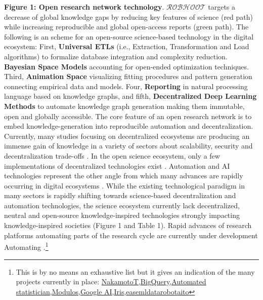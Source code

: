 \documentclass[10pt, a4paper, twocolumn]{article} %
\begin{document}
{{\small {\bf Figure 1: Open research network technology}. {\bf
    $\mathcal{ROBHOOT}$} targets a decrease of global knowledge gaps
  by reducing key features of science (red path) while increasing
  reproducible and global open-access reports (green path). The
  following is an scheme for an open-source science-based technology
  in the digital ecosystem: First, {\bf Universal ETLs} (i.e.,
  Extraction, Transformation and Load algorithms) to formalize
  database integration and complexity reduction. {\bf Bayesian Space
    Models} accounting for open-ended optimization techniques. Third,
  {\bf Animation Space} visualizing fitting procedures and pattern
  generation connecting empirical data and models. Four, {\bf
    Reporting} in natural processing language based on knowledge
  graphs, and fifth, {\bf Decentralized Deep Learning Methods} to
  automate knowledge graph generation making them immutable, open and
  globally accessible.}
The core feature of an open research network is to embed
knowledge-generation into reproducible automation and
decentralization. Currently, many studies focusing on decentralized
ecosystems are producing an immense gain of knowledge in a variety of
sectors about scalability, security and decentralization trade-offs
\citep{Golem2016,Durov2017,Androulaki2018,OceanProtocolFoundation2018,BigchainDBGmbH2018}. In
the open science ecosystem, only a few implementations of
decentralized technologies exist \citep{Gunther2018}. Automation and
AI technologies represent the other angle from which many advances are
rapidly occurring in digital ecosystems
\citep{Schmidhuber:2015,Reichstein,Gil2019}. While the existing
technological paradigm in many sectors is rapidly shifting towards
science-based decentralization and automation technologies, the
science ecosystem currently lack decentralized, neutral and
open-source knowledge-inspired technologies strongly impacting
knowledge-inspired societies (Figure 1 and Table 1). Rapid advances of
research platforms automating parts of the research cycle are
currently under development Automating
\citep{Steinruecken,Guimera}.\footnote{This is by no means an
  exhaustive list but it gives an indication of the many projects
  currently in place:
  \href{https://www.nterminal.com}{NakamotoT},\href{https://cloud.google.com/bigquery/}{BigQuery},\href{https://www.automaticstatistician.com/index/}{Automated
    statistician},\href{http://www.modulos.ai/}{Modulos},\href{https://ai.google/}{Google
    AI},\href{https://iris.ai}{Iris},\href{https://github.com/DS3Lab/easeml}{easeml}\href{https://www.datarobot.com/}{datarobot}\href{https://aito.ai/}{aito}}
}
\end{document}
